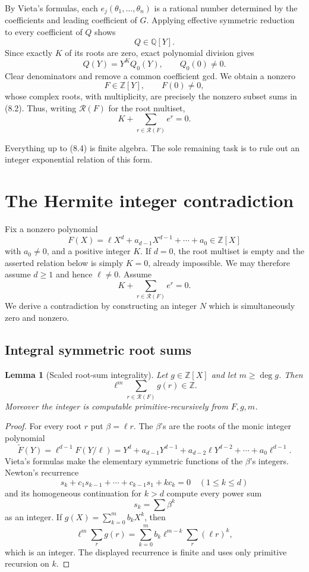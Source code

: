 \documentclass[11pt]{article}
\newtheorem{lemma}[theorem]{Lemma}
\newcommand{\Q}{\mathbb{Q}}
\newcommand{\Z}{\mathbb{Z}}
\begin{document}
By Vieta's formulas, each $e_j(\theta_1,\ldots,\theta_n)$ is a rational number determined by the coefficients and leading coefficient of $G$.  Applying effective symmetric reduction to every coefficient of $Q$ shows
\[
  Q\in\Q[Y].
\]
Since exactly $K$ of its roots are zero, exact polynomial division gives
\[
  Q(Y)=Y^K Q_0(Y),\qquad Q_0(0)\ne0.
\]
Clear denominators and remove a common coefficient gcd.  We obtain a nonzero
\[
  F\in\Z[Y],\qquad F(0)\ne0,                               \tag{8.3}
\]
whose complex roots, with multiplicity, are precisely the nonzero subset sums in (8.2).  Thus, writing $\mathcal R(F)$ for the root multiset,
\[
  K+\sum_{r\in\mathcal R(F)}e^r=0.                         \tag{8.4}
\]

Everything up to (8.4) is finite algebra.  The sole remaining task is to rule out an integer exponential relation of this form.

\section{The Hermite integer contradiction}

Fix a nonzero polynomial
\[
  F(X)=\ell X^d+a_{d-1}X^{d-1}+\cdots+a_0\in\Z[X]
\]
with $a_0\ne0$, and a positive integer $K$.  If $d=0$, the root multiset is empty and the asserted relation below is simply $K=0$, already impossible.  We may therefore assume $d\ge1$ and hence $\ell\ne0$.  Assume
\[
  K+\sum_{r\in\mathcal R(F)}e^r=0.                         \tag{9.1}
\]
We derive a contradiction by constructing an integer $N$ which is simultaneously zero and nonzero.

\subsection{Integral symmetric root sums}

\begin{lemma}[Scaled root-sum integrality]\label{lem:rootsum}
Let $g\in\Z[X]$ and let $m\ge\deg g$.  Then
\[
  \ell^m\sum_{r\in\mathcal R(F)}g(r)\in\Z.
\]
Moreover the integer is computable primitive-recursively from $F,g,m$.
\end{lemma}

\begin{proof}
For every root $r$ put $\beta=\ell r$.  The $\beta$'s are the roots of the monic integer polynomial
\[
  \widetilde F(Y)=\ell^{d-1}F(Y/\ell)
  =Y^d+a_{d-1}Y^{d-1}+a_{d-2}\ell Y^{d-2}+\cdots+a_0\ell^{d-1}.
\]
Vieta's formulas make the elementary symmetric functions of the $\beta$'s integers.  Newton's recurrence
\[
  s_k+c_1s_{k-1}+\cdots+c_{k-1}s_1+k c_k=0
  \quad(1\le k\le d)
\]
and its homogeneous continuation for $k>d$ compute every power sum
\[
  s_k=\sum\beta^k
\]
as an integer.  If $g(X)=\sum_{k=0}^m b_kX^k$, then
\[
  \ell^m\sum_r g(r)
   =\sum_{k=0}^m b_k\ell^{m-k}\sum_r(\ell r)^k,
\]
which is an integer.  The displayed recurrence is finite and uses only primitive recursion on $k$.
\end{proof}
\end{document}

